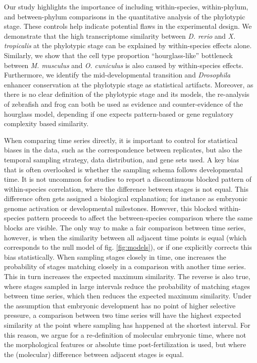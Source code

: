 Our study highlights the importance of including within-species, within-phylum, and between-phylum comparisons in the quantitative analysis of the phylotypic stage. These controls help indicate potential flaws in the experimental design. We demonstrate that the high transcriptome similarity between \textit{D. rerio} and \textit{X. tropicalis} at the phylotypic stage\cite{marletaz2018} can be explained by within-species effects alone. Similarly, we show that the cell type proportion ``hourglass-like'' bottleneck between \textit{M. musculus} and \textit{O. cuniculus}\cite{Mayshar2023} is also caused by within-species effects. Furthermore, we identify the mid-developmental transition\cite{Levin2016} and \textit{Drosophila} enhancer conservation at the phylotypic stage\cite{Liu2021} as statistical artifacts. Moreover, as there is no clear definition of the phylotypic stage and its models, the re-analysis of zebrafish and frog can both be used as evidence and counter-evidence of the hourglass model, depending if one expects pattern-based or gene regulatory complexity based similarity.

When comparing time series directly, it is important to control for statistical biases in the data, such as the correspondence between replicates, but also the temporal sampling strategy, data distribution, and gene sets used. A key bias that is often overlooked is whether the sampling schema follows developmental time\cite{BinindaEmonds2002}. It is not uncommon for studies to report a discontinuous blocked pattern of within-species correlation, where the difference between stages is not equal. This difference often gets assigned a biological explanation; for instance as embryonic genome activation\cite{Yanai2011} or developmental milestones\cite{Levin2012}. However, this blocked within-species pattern proceeds to affect the between-species comparison where the same blocks are visible. The only way to make a fair comparison between time series, however, is when the similarity between all adjacent time points is equal (which corresponds to the null model of fig. \ref{fig:models}), or if one explicitly corrects this bias statistically. When sampling stages closely in time, one increases the probability of stages matching closely in a comparison with another time series. This in turn increases the expected maximum similarity. The reverse is also true, where stages sampled in large intervals reduce the probability of matching stages between time series, which then reduces the expected maximum similarity. Under the assumption that embryonic development has no point of higher selective pressure, a comparison between two time series will have the highest expected similarity at the point where sampling has happened at the shortest interval. For this reason, we argue for a re-definition of molecular embryonic time, where not the morphological features or absolute time post-fertilization is used, but where the (molecular) difference between adjacent stages is equal. 

